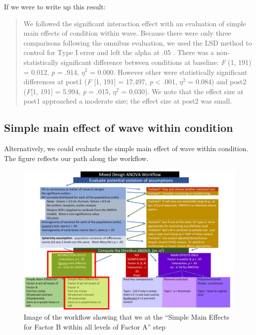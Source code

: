 \documentclass[
  11pt,
]{book}
\begin{document}
If we were to write up this result:

\begin{quote}
We followed the significant interaction effect with an evaluation of simple main effects of condition within wave. Because there were only three comparisons following the omnibus evaluation, we used the LSD method to control for Type I error and left the alpha at .05 \citep{green_using_2014}. There was a non-statistically significant difference between conditions at baseline: \emph{F} (1, 191) = 0.012, \emph{p} = .914, \(\eta^{2}\) = 0.000. However other were statistically significant differences at post1 (\emph{F} {[}1, 191{]} = 17.497, \emph{p} \textless{} .001, \(\eta^{2}\) = 0.084) and post2 (\emph{F}{[}1, 191{]} = 5.994, \emph{p} = .015, \(\eta^{2}\) = 0.030). We note that the effect size at post1 approached a moderate size; the effect size at post2 was small.
\end{quote}

\hypertarget{simple-main-effect-of-wave-within-condition}{%
\subsection{Simple main effect of wave within condition}\label{simple-main-effect-of-wave-within-condition}}

Alternatively, we could evaluate the simple main effect of wave within condition. The figure reflects our path along the workflow.

\begin{figure}
\centering
\includegraphics{images/mixed/mx_SimplemainB.jpg}
\caption{Image of the workflow showing that we at the ``Simple Main Effects for Factor B within all levels of Factor A'' step}
\end{figure}
\end{document}
